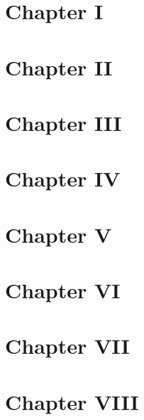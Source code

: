 \mainmatter
\chapter{Chapter I}
\thispagestyle{fancy}
\bigskip


\clearpage
\chapter{Chapter II}
\thispagestyle{fancy}
\bigskip


\clearpage
\chapter{Chapter III}
\thispagestyle{fancy}
\bigskip


\clearpage
\chapter{Chapter IV}
\thispagestyle{fancy}
\bigskip


\clearpage
\chapter{Chapter V}
\thispagestyle{fancy}
\bigskip


\clearpage
\chapter{Chapter VI}
\thispagestyle{fancy}
\bigskip


\clearpage
\chapter{Chapter VII}
\thispagestyle{fancy}
\bigskip


\clearpage
\chapter{Chapter VIII}
\thispagestyle{fancy}
\bigskip



